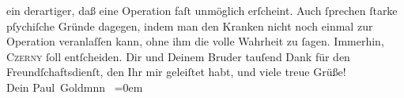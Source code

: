 \begin{ledgroupsized}[t]{13cm}
               {\pb}ein derartiger, daß eine Operation faſt unmöglich erſcheint. Auch
               ſprechen ſtarke pſychiſche Gründe dagegen, indem man den Kranken nicht noch einmal zur Operation veranlaſſen kann, ohne ihm die volle
               Wahrheit zu ſagen. Immerhin, \textsc{Czerny} ſoll entſcheiden.\pend
           \pstart
           Dir und Deinem Bruder tauſend Dank für den Freundſchaftsdienſt, den Ihr mir geleiſtet habt, und viele treue Grüße!
               {\\[\baselineskip]}Dein \spacefill\mbox{Paul Goldmnn }\pend
           \leftskip=0em{}
         
         \endnumbering{}\end{ledgroupsized}\begin{anhang}\end{anhang}\newcommand{\dateiname}{L03244}\newcommand{\titel}{Paul Goldmann an Arthur Schnitzler, 20. 4. [1906]}\newcommand{\editorInnen}{Martin Anton Müller und Laura Untner}
      